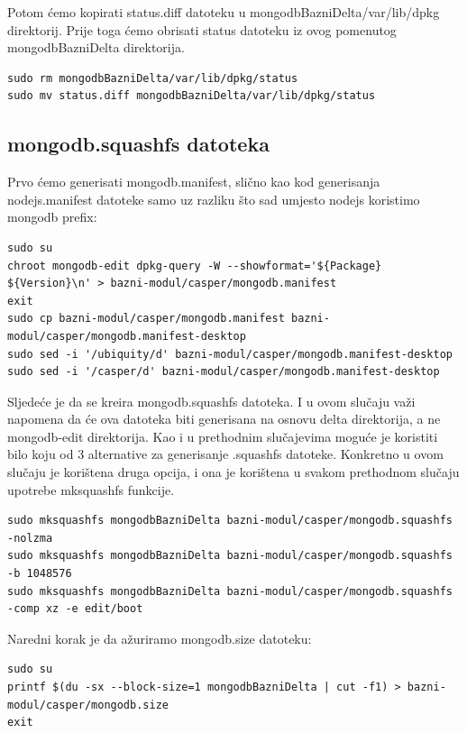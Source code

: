 \documentclass[12pt,vi]{mitthesis}
\begin{document}
\indent
Potom ćemo kopirati status.diff datoteku u mongodbBazniDelta/var/lib/dpkg direktorij. Prije toga ćemo obrisati status datoteku iz ovog pomenutog mongodbBazniDelta direktorija.\\
\begin{lstlisting}[style=BashInputStyle]
sudo rm mongodbBazniDelta/var/lib/dpkg/status
sudo mv status.diff mongodbBazniDelta/var/lib/dpkg/status
\end{lstlisting}

\subsection*{mongodb.squashfs datoteka}
\indent
Prvo ćemo generisati mongodb.manifest, slično kao kod generisanja nodejs.manifest datoteke samo uz razliku što sad umjesto nodejs koristimo mongodb prefix:
\begin{lstlisting}[style=BashInputStyle]
sudo su
chroot mongodb-edit dpkg-query -W --showformat='${Package} ${Version}\n' > bazni-modul/casper/mongodb.manifest
exit
sudo cp bazni-modul/casper/mongodb.manifest bazni-modul/casper/mongodb.manifest-desktop
sudo sed -i '/ubiquity/d' bazni-modul/casper/mongodb.manifest-desktop
sudo sed -i '/casper/d' bazni-modul/casper/mongodb.manifest-desktop
\end{lstlisting}
\indent
Sljedeće je da se kreira mongodb.squashfs datoteka. I u ovom slučaju važi napomena da će ova datoteka biti generisana na osnovu delta direktorija, a ne mongodb-edit direktorija. Kao i u prethodnim slučajevima moguće je koristiti bilo koju od 3 alternative za generisanje .squashfs datoteke. Konkretno u ovom slučaju je korištena druga opcija, i ona je korištena u svakom prethodnom slučaju upotrebe mksquashfs funkcije.
\begin{lstlisting}[style=BashInputStyle]
sudo mksquashfs mongodbBazniDelta bazni-modul/casper/mongodb.squashfs -nolzma 
sudo mksquashfs mongodbBazniDelta bazni-modul/casper/mongodb.squashfs -b 1048576
sudo mksquashfs mongodbBazniDelta bazni-modul/casper/mongodb.squashfs -comp xz -e edit/boot
\end{lstlisting}

\noindent
Naredni korak je da ažuriramo mongodb.size datoteku:
\begin{lstlisting}[style=BashInputStyle]
sudo su
printf $(du -sx --block-size=1 mongodbBazniDelta | cut -f1) > bazni-modul/casper/mongodb.size
exit
\end{lstlisting}
\end{document}
